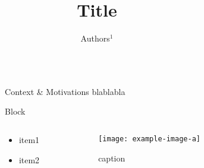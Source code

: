 \documentclass[final,hyperref={pdfpagelabels=false}]{beamer}
\title{\huge Title} %
\author{\normalsize Authors$^1$} %
\institute{\small$^1$ Northern Robotics Laboratory, Universit\'e Laval} %
\begin{document}

\begin{frame}[t] %

\begin{columns}[t] %

\begin{column}{.02\textwidth}\end{column} %

\begin{column}{.465\textwidth} %


\begin{block}{Context \& Motivations}
blablabla
\end{block}

\begin{block}{Block}
	\begin{columns} %
	\begin{column}{.58\textwidth} %
		\begin{itemize}
			\item item1
			\item item2 
		\end{itemize}
	\end{column}
	\begin{column}{.42\textwidth} %
		\centering
		\begin{figure}
			\texttt{[image: example-image-a]}
			\caption{caption}
		\end{figure}
	\end{column}
	\end{columns} %
\end{block}




\end{column}
\end{columns}
\end{frame}
\end{document}
